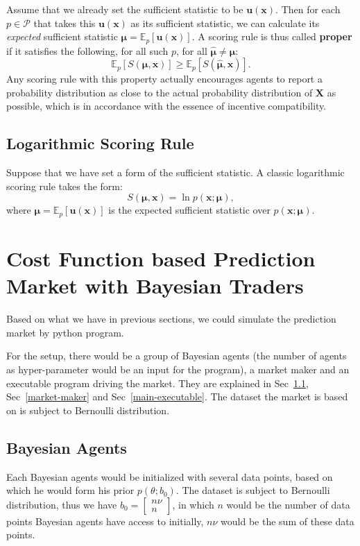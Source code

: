 \documentclass[12pt]{article}
\begin{document}
Assume that we already set the sufficient statistic to be $\mathbf{u}(\mathbf{x})$. Then for each $p\in \mathcal{P}$ that takes this $\mathbf{u}(\mathbf{x})$ as its sufficient statistic, we can calculate its \textit{expected} sufficient statistic $\bm{\mu}=\mathbb{E}_p[\mathbf{u}(\mathbf{x})]$. A scoring rule is thus called \textbf{proper} if it satisfies the following, for all such $p$, for all $\bm{\hat{\mu}}\neq\bm{\mu}$:
\[\mathbb{E}_p[S(\bm{\mu},\mathbf{x})]\geqslant \mathbb{E}_p[S(\bm{\hat{\mu}},\mathbf{x})].\]
Any scoring rule with this property actually encourages agents to report a probability distribution as close to the actual probability distribution of $\mathbf{X}$ as possible, which is in accordance with the essence of incentive compatibility.

\subsection{Logarithmic Scoring Rule}
Suppose that we have set a form of the sufficient statistic. A classic logarithmic scoring rule takes the form:
\[S(\bm{\mu},\mathbf{x})=\ln p(\mathbf{x};\bm{\mu}),\]
where $\bm{\mu}=\mathbb{E}_p[\mathbf{u}(\mathbf{x})]$ is the expected sufficient statistic over $p(\mathbf{x};\bm{\mu})$.

\newpage
\section{Cost Function based Prediction Market with Bayesian Traders}
Based on what we have in previous sections, we could simulate the prediction market by python program.

For the setup, there would be a group of Bayesian agents (the number of agents as hyper-parameter would be an input for the program), a market maker and an executable program driving the market. They are explained in Sec~\ref{Bayesian-agents}, Sec~\ref{market-maker} and Sec~\ref{main-executable}. The dataset the market is based on is subject to Bernoulli distribution. 

\subsection{Bayesian Agents}\label{Bayesian-agents}
Each Bayesian agents would be initialized with several data points, based on which he would form his prior $p(\theta; b_0)$. The dataset is subject to Bernoulli distribution, %
thus we have $b_0=\begin{bmatrix}n\nu \\n\end{bmatrix}$, in which $n$ would be the number of data points Bayesian agents have access to initially, $n\nu$ would be the sum of these data points.
\end{document}
